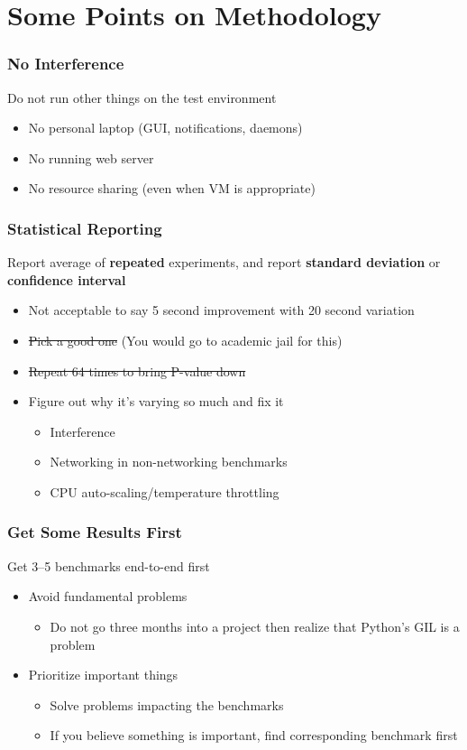\documentclass[xcolor={dvipsnames},aspectratio=149]{beamer}
\begin{document}
\section{Some Points on Methodology}
\begin{frame}
  \frametitle{No Interference}
  Do not run other things on the test environment
  \begin{itemize}
  \item No personal laptop (GUI, notifications, daemons)
  \item No running web server
  \item No resource sharing (even when VM is appropriate)
  \end{itemize}
\end{frame}

\begin{frame}
  \frametitle{Statistical Reporting}
  Report average of \textbf{repeated} experiments, and report \textbf{standard deviation} or
  \textbf{confidence interval}
  \begin{itemize}
  \item Not acceptable to say 5 second improvement with 20 second variation
  \item \sout{Pick a good one} (You would go to academic jail for this)
  \item \sout{Repeat 64 times to bring P-value down}
  \item Figure out why it's varying so much and fix it
    \begin{itemize}
    \item Interference
    \item Networking in non-networking benchmarks
    \item CPU auto-scaling/temperature throttling
    \end{itemize}
  \end{itemize}
\end{frame}

\begin{frame}
  \frametitle{Get Some Results First}
  Get 3--5 benchmarks end-to-end first
  \begin{itemize}
  \item Avoid fundamental problems
    \begin{itemize}
    \item Do not go three months into a project then realize that Python's GIL is a problem
    \end{itemize}
  \item Prioritize important things
    \begin{itemize}
    \item Solve problems impacting the benchmarks
    \item If you believe something is important, find corresponding benchmark first
    \end{itemize}
  \end{itemize}
\end{frame}
\end{document}
